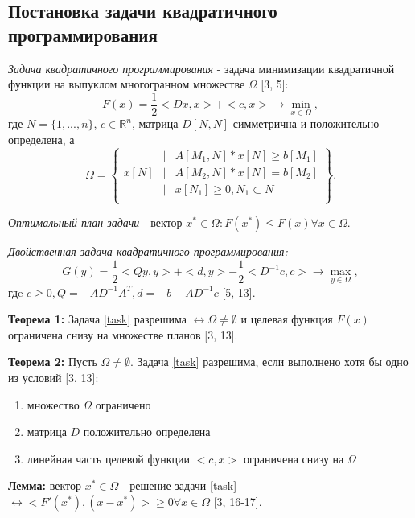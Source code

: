 \documentclass[main.tex]{subfiles}
\begin{document}
\subsection{Постановка задачи квадратичного программирования}
\textit{Задача квадратичного программирования} - задача минимизации квадратичной функции на выпуклом многогранном множестве $\Omega$ [3, 5]:
\begin{equation}
    F(x)=\frac{1}{2}<Dx,x>+<c,x>\rightarrow\min_{x\in\Omega},
    \label{task}
\end{equation}
где $N=\{1,...,n\}$, $c\in\mathbb{R}^n$, матрица $D[N,N]$ симметрична и положительно определена, а
\begin{equation}
    \Omega=
    \left\{
    \begin{matrix}
        & | & A[M_1,N]*x[N]\geq b[M_1]\\
        x[N] & | & A[M_2,N]*x[N]=b[M_2]\\
        & | & x[N_1]\geq0,N_1\subset N\\\
    \end{matrix}
    \right\}.
\end{equation}

\textit{Оптимальный план задачи} - вектор  $x^*\in\Omega:F(x^*)\leq F(x)\forall x\in\Omega$.

\textit{Двойственная задача квадратичного программирования:}
\begin{equation}
        G(y)=\frac{1}{2}<Qy,y>+<d,y>-\frac{1}{2}<D^{-1}c,c>\rightarrow\max_{y\in\Omega},
\end{equation}
гдe $c\geq0,Q=-AD^{-1}A^T,d=-b-AD^{-1}c$ [5, 13].

\textbf{Теорема 1:} Задача \eqref{task} разрешима $\leftrightarrow\Omega\not=\emptyset$ и целевая функция $F(x)$ ограничена снизу на множестве планов [3, 13].

\textbf{Теорема 2:} Пусть $\Omega\not=\emptyset$. Задача \eqref{task} разрешима, если выполнено хотя бы одно из условий [3, 13]:
\begin{enumerate}
    \item множество $\Omega$ ограничено
    \item матрица $D$ положительно определена
    \item линейная часть целевой функции $<c,x>$ ограничена снизу на $\Omega$
\end{enumerate}

\textbf{Лемма:} вектор $x^*\in\Omega$ - решение задачи \eqref{task} $\leftrightarrow<F'(x^*),(x-x^*)>\geq0\forall x\in\Omega$ [3, 16-17].
\end{document}
